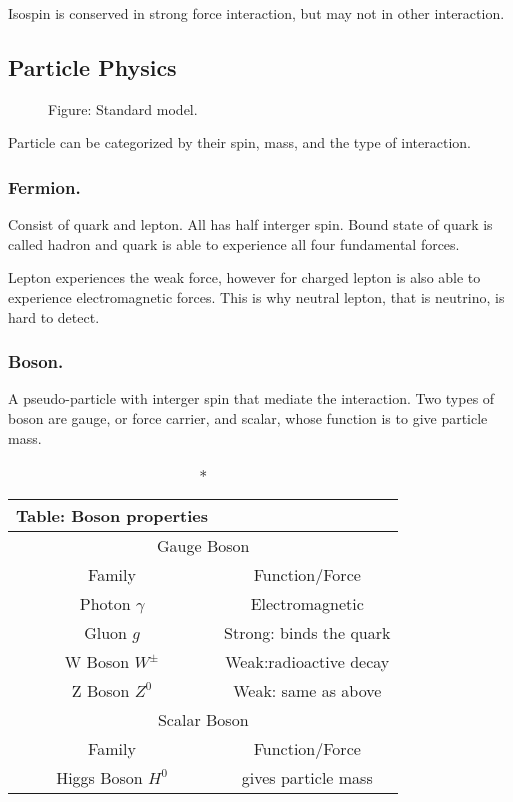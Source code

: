 \documentclass[../../../main.tex]{subfiles}
\begin{document}
Isospin is conserved in strong force interaction, but may not in other interaction.

\subsection*{Particle Physics}
\begin{figure*}
    \centering
    \caption*{Figure: Standard model.}
\end{figure*}
Particle can be categorized by their spin, mass, and the type of interaction.
\subsubsection*{Fermion.} Consist of quark and lepton. All has half interger spin. Bound state of quark is called hadron and quark is able to experience all four fundamental forces.

Lepton experiences the weak force, however for charged lepton is also able to experience electromagnetic forces. This is why neutral lepton, that is neutrino, is hard to detect.

\subsubsection*{Boson.} A pseudo-particle with interger spin that mediate the interaction. Two types of boson are gauge, or force carrier, and scalar, whose function is to give particle mass. 
\begin{longtable}{c|c}
    \caption*{Table: Boson properties}\\
    \hline
    \multicolumn{2}{c}{Gauge Boson}\\
    \hline
    Family&Function/Force\\
    \hline 
    \hline
    Photon $\gamma$&Electromagnetic\\
    Gluon $g$&Strong: binds the quark\\
    W Boson $W^{\pm}$&Weak:radioactive decay\\
    Z Boson $Z^0$&Weak: same as above\\
    \hline
    \hline
    \multicolumn{2}{c}{Scalar Boson}\\
    \hline
    Family&Function/Force\\
    \hline 
    \hline
    Higgs Boson $H^0$&gives particle mass\\
    \hline
\end{longtable}
\end{document}
